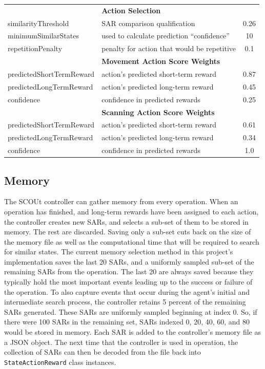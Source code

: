 \begin{table}
{\begin{tabular}{ l l c }
    \hline
                                      & \textbf{Action Selection}& \\
    similarityThreshold               & SAR comparison qualification  & 0.26  \\
    minimumSimilarStates              & used to calculate prediction ``confidence''    & 10    \\
    repetitionPenalty                 & penalty for action that would be repetitive                & 0.1   \\
    \hline
                                      & \textbf{Movement Action Score Weights}& \\
    predictedShortTermReward          & action's predicted short-term reward       & 0.87  \\
    predictedLongTermReward           & action's predicted long-term reward      & 0.45  \\
    confidence                        & confidence in predicted rewards       & 0.25  \\
    \hline
                                      & \textbf{Scanning Action Score Weights}& \\
    predictedShortTermReward          & action's predicted short-term reward       & 0.61  \\
    predictedLongTermReward           & action's predicted long-term reward      & 0.34  \\
    confidence                        & confidence in predicted rewards       & 1.0   \\
    \hline
  \end{tabular}}
  \label{table:evolved_weight_set}
\end{table}


\subsection{Memory}
The SCOUt controller can gather memory from every operation.
When an operation has finished, and long-term rewards have been assigned to each action, the controller creates new SARs, and selects a sub-set of them to be stored in memory.
The rest are discarded.
Saving only a sub-set cuts back on the size of the memory file as well as the computational time that will be required to search for similar states.
The current memory selection method in this project's implementation saves the last 20 SARs, and a uniformly sampled sub-set of the remaining SARs from the operation.
The last 20 are always saved because they typically hold the most important events leading up to the success or failure of the operation.
To also capture events that occur during the agent's initial and intermediate search process, the controller retains 5 percent of the remaining SARs generated.
These SARs are uniformly sampled beginning at index 0.
So, if there were 100 SARs in the remaining set, SARs indexed 0, 20, 40, 60, and 80 would be stored in memory.
Each SAR is added to the controller's memory file as a JSON object.
The next time that the controller is used in operation, the collection of SARs can then be decoded from the file back into \texttt{StateActionReward} class instances.


